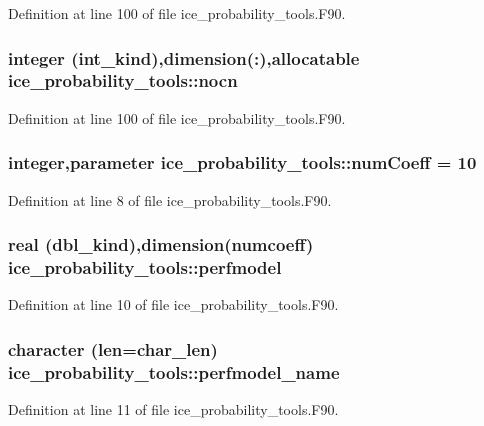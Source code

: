 Definition at line 100 of file ice\_\-probability\_\-tools.F90.\hypertarget{namespaceice__probability__tools_aff66cd322edf027b1f82d23dca0e277e}{
\subsubsection[{nocn}]{\setlength{\rightskip}{0pt plus 5cm}integer (int\_\-kind),dimension(:),allocatable {\bf ice\_\-probability\_\-tools::nocn}}}
\label{namespaceice__probability__tools_aff66cd322edf027b1f82d23dca0e277e}


Definition at line 100 of file ice\_\-probability\_\-tools.F90.\hypertarget{namespaceice__probability__tools_a19cc6dcab9584f8783ab3cece86c3966}{
\subsubsection[{numCoeff}]{\setlength{\rightskip}{0pt plus 5cm}integer,parameter {\bf ice\_\-probability\_\-tools::numCoeff} = 10}}
\label{namespaceice__probability__tools_a19cc6dcab9584f8783ab3cece86c3966}


Definition at line 8 of file ice\_\-probability\_\-tools.F90.\hypertarget{namespaceice__probability__tools_af927f37aef7bc03ca64ba094ea588760}{
\subsubsection[{perfmodel}]{\setlength{\rightskip}{0pt plus 5cm}real (dbl\_\-kind),dimension(numcoeff) {\bf ice\_\-probability\_\-tools::perfmodel}}}
\label{namespaceice__probability__tools_af927f37aef7bc03ca64ba094ea588760}


Definition at line 10 of file ice\_\-probability\_\-tools.F90.\hypertarget{namespaceice__probability__tools_a5907d2a055440e7db18603f97f34d6d3}{
\subsubsection[{perfmodel\_\-name}]{\setlength{\rightskip}{0pt plus 5cm}character (len=char\_\-len) {\bf ice\_\-probability\_\-tools::perfmodel\_\-name}}}
\label{namespaceice__probability__tools_a5907d2a055440e7db18603f97f34d6d3}


Definition at line 11 of file ice\_\-probability\_\-tools.F90.